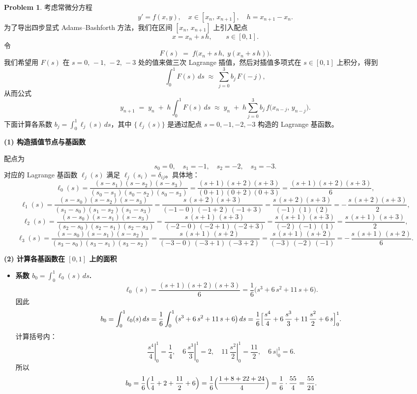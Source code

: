 \documentclass[a4paper]{article}
\theoremstyle{definition}
\newtheorem{problem}{Problem}
\theoremstyle{plain}
\newcommand{\<}{\left<}
\renewcommand{\>}{\right>}
\numberwithin{equation}{problem}
\begin{document}
\begin{problem}
    考虑常微分方程 
\[
y' = f(x,y), \quad x \in [x_n,\,x_{n+1}], \quad h = x_{n+1} - x_n.
\]
为了导出四步显式 Adams–Bashforth 方法，我们在区间 $[x_n,\,x_{n+1}]$ 上引入配点
\[
x = x_n + s\,h,\qquad s \in [0,1].
\]
令
\[
F(s) \;=\; f\bigl(x_n + s\,h,\;y(x_n + s\,h)\bigr).
\]
我们希望用 $F(s)$ 在 $s = 0,\,-1,\,-2,\,-3$ 处的值来做三次 Lagrange 插值，然后对插值多项式在 $s\in[0,1]$ 上积分，得到
\[
\int_{0}^{1} F(s)\,ds
\;\approx\;
\sum_{j=0}^{3} b_j\,F(-\,j),
\]
从而公式
\[
y_{n+1} \;=\; y_n \;+\; h \int_{0}^{1} F(s)\,ds
\;\approx\;
y_n \;+\; h \sum_{j=0}^{3} b_j\,f\bigl(x_{n-j},\,y_{n-j}\bigr).
\]
下面计算各系数 $b_j = \displaystyle\int_{0}^{1} \ell_j(s)\,ds$，其中 $\{\ell_j(s)\}$ 是通过配点 $s=0,-1,-2,-3$ 构造的 Lagrange 基函数。

\medskip

\noindent\textbf{(1) 构造插值节点与基函数}  

配点为
\[
s_0 = 0,\quad s_1 = -1,\quad s_2 = -2,\quad s_3 = -3.
\]
对应的 Lagrange 基函数 $\ell_j(s)$ 满足 $\ell_j(s_i) = \delta_{ij}$。具体地：
\[
\ell_0(s)
= \frac{(s - s_1)(s - s_2)(s - s_3)}{(s_0 - s_1)(s_0 - s_2)(s_0 - s_3)}
= \frac{(s + 1)(s + 2)(s + 3)}{(0 + 1)(0 + 2)(0 + 3)}
= \frac{(s + 1)(s + 2)(s + 3)}{6},
\]
\[
\ell_1(s)
= \frac{(s - s_0)(s - s_2)(s - s_3)}{(s_1 - s_0)(s_1 - s_2)(s_1 - s_3)}
= \frac{s\,(s + 2)(s + 3)}{(-1 - 0)\,(-1 + 2)\,(-1 + 3)}
= \frac{s\,(s + 2)(s + 3)}{(-1)\,(1)\,(2)}
= -\,\frac{s\,(s + 2)(s + 3)}{2},
\]
\[
\ell_2(s)
= \frac{(s - s_0)(s - s_1)(s - s_3)}{(s_2 - s_0)(s_2 - s_1)(s_2 - s_3)}
= \frac{s\,(s + 1)\,(s + 3)}{(-2 - 0)\,(-2 + 1)\,(-2 + 3)}
= \frac{s\,(s + 1)\,(s + 3)}{(-2)\,(-1)\,(1)}
= \frac{s\,(s + 1)\,(s + 3)}{2},
\]
\[
\ell_3(s)
= \frac{(s - s_0)(s - s_1)(s - s_2)}{(s_3 - s_0)(s_3 - s_1)(s_3 - s_2)}
= \frac{s\,(s + 1)\,(s + 2)}{(-3 - 0)\,(-3 + 1)\,(-3 + 2)}
= \frac{s\,(s + 1)\,(s + 2)}{(-3)\,(-2)\,(-1)}
= -\,\frac{s\,(s + 1)\,(s + 2)}{6}.
\]

\medskip

\noindent\textbf{(2) 计算各基函数在 $[0,1]$ 上的面积}  

\begin{itemize}
  \item \textbf{系数 $b_0 = \displaystyle\int_{0}^{1} \ell_0(s)\,ds$.}  
    \[
    \ell_0(s) = \frac{(s + 1)(s + 2)(s + 3)}{6}
    = \frac{1}{6}\bigl(s^3 + 6\,s^2 + 11\,s + 6\bigr).
    \]
    因此
    \[
    b_0 
    = \int_{0}^{1} \ell_0(s)\,ds
    = \frac{1}{6} \int_{0}^{1} \bigl(s^3 + 6\,s^2 + 11\,s + 6\bigr)\,ds
    = \frac{1}{6} \Bigl[
       \frac{s^4}{4} + 6\,\frac{s^3}{3} + 11\,\frac{s^2}{2} + 6\,s
    \Bigr]_{0}^{1}.
    \]
    计算括号内：
    \[
    \left.\frac{s^4}{4}\right|_{0}^{1} = \frac{1}{4},\quad
    \left.6\,\frac{s^3}{3}\right|_{0}^{1} = 2,\quad
    \left.11\,\frac{s^2}{2}\right|_{0}^{1} = \frac{11}{2},\quad
    \left.6\,s\right|_{0}^{1} = 6.
    \]
    所以
    \[
    b_0 
    = \frac{1}{6} \Bigl( \frac{1}{4} + 2 + \frac{11}{2} + 6 \Bigr)
    = \frac{1}{6} \Bigl( \frac{1 + 8 + 22 + 24}{4} \Bigr)
    = \frac{1}{6} \cdot \frac{55}{4}
    = \frac{55}{24}.
    \]
  

\end{itemize}
\end{problem}
\end{document}
